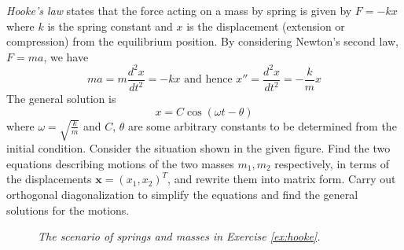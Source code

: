 \begin{Exercise}
\label{ex:hooke}
\textit{Hooke's law} states that the force acting on a mass by spring is given by $F = -kx$ where $k$ is the spring constant and $x$ is the displacement (extension or compression) from the equilibrium position. By considering Newton's second law, $F = ma$, we have
\begin{equation*}
ma = m\frac{d^2x}{dt^2} = -kx\text{ and hence }x'' = \frac{d^2x}{dt^2} = -\frac{k}{m}x
\end{equation*}
The general solution is
\begin{equation*}
x = C\cos(\omega t - \theta)
\end{equation*}
where $\omega = \sqrt{\frac{k}{m}}$ and $C$, $\theta$ are some arbitrary constants to be determined from the initial condition. Consider the situation shown in the given figure. Find the two equations describing motions of the two masses $m_1, m_2$ respectively, in terms of the displacements $\textbf{x} = (x_1, x_2)^T$, and rewrite them into matrix form. Carry out orthogonal diagonalization to simplify the equations and find the general solutions for the motions.
\begin{figure}[t!]
\centering
{}  
\caption{\textit{The scenario of springs and masses in Exercise \ref{ex:hooke}.}}
\end{figure}
\end{Exercise}
